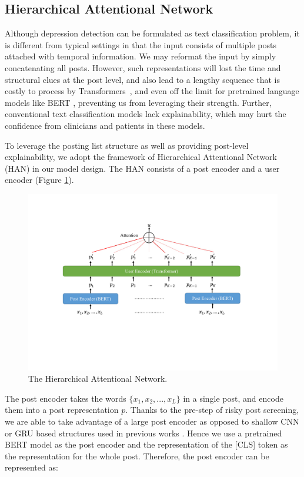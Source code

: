 \subsection{Hierarchical Attentional Network}
\label{sec:HAN}

Although depression detection can be formulated as text classification problem, it is different from typical settings in that the input consists of multiple posts attached with temporal information. We may reformat the input by simply concatenating all posts. However, such representations will lost the time and structural clues at the post level, and also lead to a lengthy sequence that is costly to
process by Transformers~\citep{vaswani2017attention}, and even off the limit 
for pretrained language models like BERT \citep{devlin2018bert}, 
preventing us from leveraging their strength. Further, conventional text 
classification models lack explainability, which may hurt the confidence 
from clinicians and patients in these models. 

To leverage the posting list structure as well as providing post-level explainability, we adopt the framework of Hierarchical Attentional Network (HAN) \citep{yang2016hierarchical} in our model design. The HAN consists of a post encoder and a user encoder (Figure \ref{fig:han}). 

\begin{figure}[h]
    \centering
    \includegraphics[width=\columnwidth]{figures/han.pdf}
    \caption{The Hierarchical Attentional Network.}
    \label{fig:han}
\end{figure}

The post encoder takes the words $\{x_1, x_2, ..., x_L\}$ in a single post, and encode them into a post representation $p$. Thanks to the pre-step of risky post screening, we are able to take advantage of a large post encoder as opposed to shallow CNN or GRU based structures used in previous works \citep{yates2017depression, zogan2021explainable}. Hence we use a pretrained BERT model as the post encoder and the representation of the [CLS] token as the representation for the whole post. Therefore, the post encoder can be represented as: 

